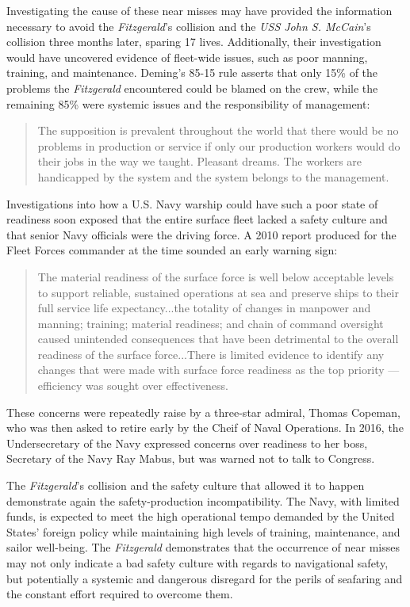 \documentclass[twoside,symmetric,notoc]{tufte-book}
\begin{document}
\par{%
Investigating the cause of these near misses may have provided the information necessary to avoid the \textit{Fitzgerald}'s collision and the \textit{USS John S. McCain}'s collision three months later, sparing 17 lives. Additionally, their investigation would have uncovered evidence of fleet-wide issues, such as poor manning, training, and maintenance. Deming's 85-15 rule asserts that only 15\% of the problems the \textit{Fitzgerald} encountered could be blamed on the crew, while the remaining 85\% were systemic issues and the responsibility of management:
\begin{quote}
    The supposition is prevalent throughout the world that there would be no problems in production or service if only our production workers would do their jobs in the way we taught. Pleasant dreams. The workers are handicapped by the system and the system belongs to the management.\cite{Manuele}
\end{quote}
Investigations into how a U.S. Navy warship could have such a poor state of readiness soon exposed that the entire surface fleet lacked a safety culture and that senior Navy officials were the driving force. A 2010 report produced for the Fleet Forces commander at the time sounded an early warning sign:
\begin{quote}
    The material readiness of the surface force is well below acceptable levels to support reliable, sustained operations at sea and preserve ships to their full service life expectancy...the totality of changes in manpower and manning; training; material readiness; and chain of command oversight caused unintended consequences that have been detrimental to the overall readiness of the surface force...There is limited evidence to identify any changes that were made with surface force readiness as the top priority --- efficiency was sought over effectiveness.\cite{Balisle}
\end{quote}
These concerns were repeatedly raise by a three-star admiral, Thomas Copeman, who was then asked to retire early by the Cheif of Naval Operations. In 2016, the Undersecretary of the Navy expressed concerns over readiness to her boss, Secretary of the Navy Ray Mabus, but was warned not to talk to Congress.\cite{Faturechi}
}
\par{
The \textit{Fitzgerald}'s collision and the safety culture that allowed it to happen demonstrate again the safety-production incompatibility. The Navy, with limited funds, is expected to meet the high operational tempo demanded by the United States' foreign policy while maintaining high levels of training, maintenance, and sailor well-being. The \textit{Fitzgerald} demonstrates that the occurrence of near misses may not only indicate a bad safety culture with regards to navigational safety, but potentially a systemic and dangerous disregard for the perils of seafaring and the constant effort required to overcome them.
}
\end{document}
